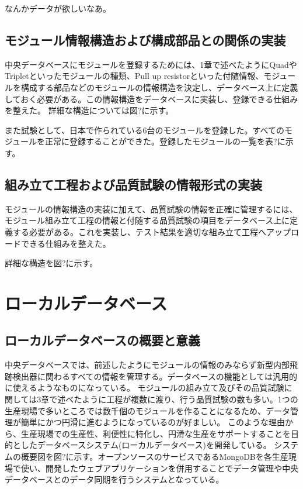 なんかデータが欲しいなあ。

\subsection{モジュール情報構造および構成部品との関係の実装}
中央データベースにモジュールを登録するためには、1章で述べたようにQuadやTripletといったモジュールの種類、Pull up resistorといった付随情報、モジュールを構成する部品などのモジュールの情報構造を決定し、データベース上に定義しておく必要がある。この情報構造をデータベースに実装し、登録できる仕組みを整えた。
詳細な構造については図?に示す。

また試験として、日本で作られている6台のモジュールを登録した。すべてのモジュールを正常に登録することができた。登録したモジュールの一覧を表?に示す。

\subsection{組み立て工程および品質試験の情報形式の実装}
モジュールの情報構造の実装に加えて、品質試験の情報を正確に管理するには、モジュール組み立て工程の情報と付随する品質試験の項目をデータベース上に定義する必要がある。これを実装し、テスト結果を適切な組み立て工程へアップロードできる仕組みを整えた。

詳細な構造を図?に示す。

\section{ローカルデータベース}
\subsection{ローカルデータベースの概要と意義}
中央データベースでは、前述したようにモジュールの情報のみならず新型内部飛跡検出器に関わるすべての情報を管理する。データベースの機能としては汎用的に使えるようなものになっている。
モジュールの組み立て及びその品質試験に関しては3章で述べたように工程が複数に渡り、行う品質試験の数も多い。1つの生産現場で多いところでは数千個のモジュールを作ることになるため、データ管理が簡単にかつ円滑に進むようになっているのが好ましい。
このような理由から、生産現場での生産性、利便性に特化し、円滑な生産をサポートすることを目的としたデータベースシステム(ローカルデータベース)を開発している。
システムの概要図を図?に示す。オープンソースのサービスであるMongoDBを各生産現場で使い、開発したウェブアプリケーションを併用することでデータ管理や中央データベースとのデータ同期を行うシステムとなっている。

